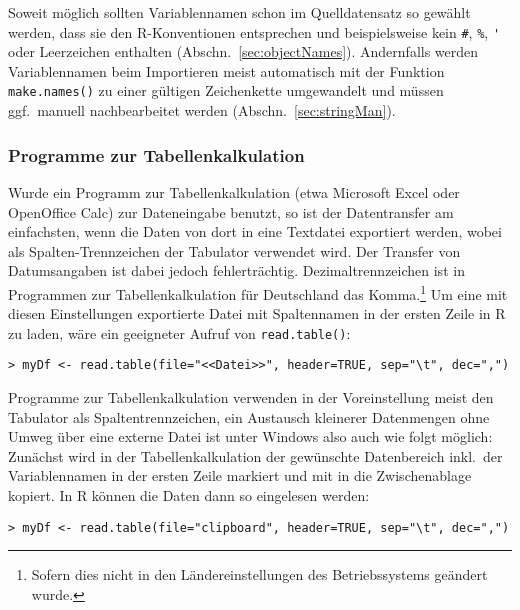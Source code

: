 Soweit möglich sollten Variablennamen schon im Quelldatensatz so gewählt werden, dass sie den R-Konventionen entsprechen und beispielsweise kein \lstinline!#!, \lstinline!%!, \lstinline!'! oder Leerzeichen enthalten (Abschn.\ \ref{sec:objectNames}). Andernfalls werden Variablennamen beim Importieren meist automatisch mit der Funktion \lstinline!make.names()! zu einer gültigen Zeichenkette umgewandelt und müssen ggf.\ manuell nachbearbeitet werden (Abschn.\ \ref{sec:stringMan}).

\subsubsection{Programme zur Tabellenkalkulation}

Wurde ein Programm zur Tabellenkalkulation (etwa Microsoft Excel oder OpenOffice Calc) zur Dateneingabe benutzt, so ist der Datentransfer am einfachsten, wenn die Daten von dort in eine Textdatei exportiert werden, wobei als Spalten-Trennzeichen der Tabulator verwendet wird. Der Transfer von Datumsangaben ist dabei jedoch fehlerträchtig. Dezimaltrennzeichen ist in Programmen zur Tabellenkalkulation für Deutschland das Komma.\footnote{Sofern dies nicht in den Ländereinstellungen des Betriebssystems geändert wurde.} Um eine mit diesen Einstellungen exportierte Datei mit Spaltennamen in der ersten Zeile in R zu laden, wäre ein geeigneter Aufruf von \lstinline!read.table()!:
\begin{lstlisting}
> myDf <- read.table(file="<<Datei>>", header=TRUE, sep="\t", dec=",")
\end{lstlisting}

Programme zur Tabellenkalkulation verwenden in der Voreinstellung meist den Tabulator als Spaltentrennzeichen, ein Austausch kleinerer Datenmengen ohne Umweg über eine externe Datei ist unter Windows also auch wie folgt möglich: Zunächst wird in der Tabellenkalkulation der gewünschte Datenbereich inkl.\ der Variablennamen in der ersten Zeile markiert und mit  in die Zwischenablage kopiert. In R können die Daten dann so eingelesen werden:
\begin{lstlisting}
> myDf <- read.table(file="clipboard", header=TRUE, sep="\t", dec=",")
\end{lstlisting}

